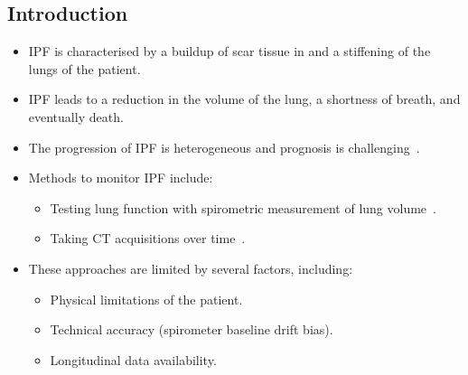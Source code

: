 \documentclass[portrait, color=UCLburgundy, margin=1cm]{uclposter}
\begin{document}
    \begin{multicols}{2}
        \section*{Introduction}
            \begin{highlightbox}[UCLlightgreen]
                \begin{itemize}
                    \item \gls{IPF} is characterised by a buildup of scar tissue in and a stiffening of the lungs of the patient.
                    
                    \item \gls{IPF} leads to a reduction in the volume of the lung, a shortness of breath, and eventually death.
                    
                    \item The progression of \gls{IPF} is heterogeneous and prognosis is challenging~\cite{King2011IdiopathicFibrosis}.
                    
                    \item Methods to monitor \gls{IPF} include:

                    \begin{itemize}
                        \item Testing lung function with spirometric measurement of lung volume~\cite{Watters1986AFibrosis}.
                        
                        \item Taking \gls{CT} acquisitions over time~\cite{Lynch2018DiagnosticPaper}.
                    \end{itemize}
                    
                    \item These approaches are limited by several factors, including:

                    \begin{itemize}
                        \item Physical limitations of the patient.
                        
                        \item Technical accuracy (spirometer baseline drift bias).
                        
                        \item Longitudinal data availability.
                    \end{itemize}


\end{itemize}
\end{highlightbox}
\end{multicols}
\end{document}
